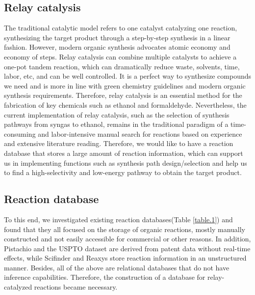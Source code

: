 \documentclass[%
 aip,
 jmp,%
 amsmath,amssymb,
 reprint,%
]{revtex4-2}
\begin{document}
\subsection{Relay catalysis}

The traditional catalytic model refers to one catalyst catalyzing one reaction, 
synthesizing the target product through a step-by-step synthesis in a linear fashion.
However, modern organic synthesis advocates atomic economy and economy of steps.
Relay catalysis can combine multiple catalysts to achieve a one-pot tandem reaction,
which can dramatically reduce waste, solvents, time, labor, etc, and can be well controlled. 
It is a perfect way to synthesize compounds we need and is more in line with green 
chemistry guidelines and modern organic synthesis requirements. Therefore, 
relay catalysis is an essential method for the fabrication of key chemicals
such as ethanol and formaldehyde. Nevertheless, the current implementation of 
relay catalysis, such as the selection of synthesis pathways from syngas to ethanol, 
remains in the traditional paradigm of a time-consuming and labor-intensive manual 
search for reactions based on experience and extensive literature reading. Therefore, 
we would like to have a reaction database that stores a large amount of reaction information, 
which can support us in implementing functions such as synthesis path design/selection 
and help us to find a high-selectivity and low-energy pathway to obtain the target product.


\subsection{Reaction database}
To this end, we investigated existing reaction databases(Table \ref{table.1}) and found that they 
all focused on the storage of organic reactions, mostly manually constructed and not easily
accessible for commercial or other reasons. In addition, Pistachio and the USPTO dataset are derived from patent data without real-time effects,
while Scifinder and Reaxys store reaction information in an unstructured manner. Besides, all of the 
above are relational databases that do not have inference capabilities. Therefore, the construction 
of a database for relay-catalyzed reactions became necessary.
\end{document}
